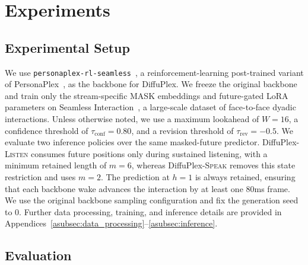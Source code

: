\section{Experiments}
\label{sec:experiments}

\subsection{Experimental Setup}
\label{subsec:experimental_setup}

We use \texttt{personaplex-rl-seamless}~\citep{ohashi2026multifacetedinteractivityalignmentfullduplex}, a reinforcement-learning post-trained variant of PersonaPlex~\citep{11463413}, as the backbone for DiffuPlex.
We freeze the original backbone and train only the stream-specific MASK embeddings and future-gated LoRA parameters on Seamless Interaction~\citep{agrawal2025seamlessinteractiondyadicaudiovisual}, a large-scale dataset of face-to-face dyadic interactions.
Unless otherwise noted, we use a maximum lookahead of $W=16$, a confidence threshold of $\tau_{\mathrm{conf}}=0.80$, and a revision threshold of $\tau_{\mathrm{rev}}=-0.5$.
We evaluate two inference policies over the same masked-future predictor.
DiffuPlex-\textsc{Listen} consumes future positions only during sustained listening, with a minimum retained length of $m=6$, whereas DiffuPlex-\textsc{Speak} removes this state restriction and uses $m=2$.
The prediction at $h=1$ is always retained, ensuring that each backbone wake advances the interaction by at least one 80ms frame.
We use the original backbone sampling configuration and fix the generation seed to 0.
Further data processing, training, and inference details are provided in Appendices~\ref{asubsec:data_processing}--\ref{asubsec:inference}.

\subsection{Evaluation}
\label{subsec:evaluation}

